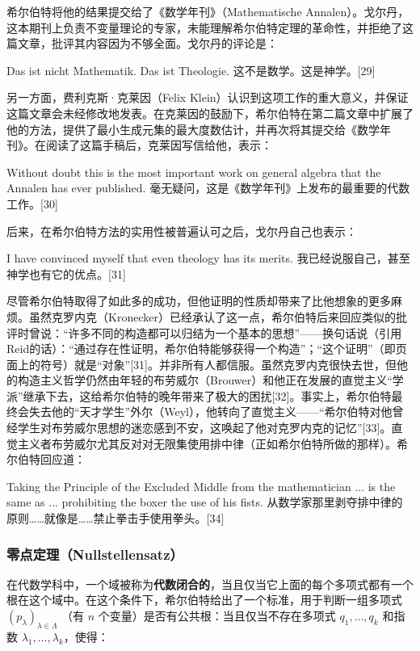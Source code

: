 希尔伯特将他的结果提交给了《数学年刊》（Mathematische Annalen）。戈尔丹，这本期刊上负责不变量理论的专家，未能理解希尔伯特定理的革命性，并拒绝了这篇文章，批评其内容因为不够全面。戈尔丹的评论是：

Das ist nicht Mathematik. Das ist Theologie.  
这不是数学。这是神学。[29]

另一方面，费利克斯·克莱因（Felix Klein）认识到这项工作的重大意义，并保证这篇文章会未经修改地发表。在克莱因的鼓励下，希尔伯特在第二篇文章中扩展了他的方法，提供了最小生成元集的最大度数估计，并再次将其提交给《数学年刊》。在阅读了这篇手稿后，克莱因写信给他，表示：

Without doubt this is the most important work on general algebra that the Annalen has ever published.  
毫无疑问，这是《数学年刊》上发布的最重要的代数工作。[30]

后来，在希尔伯特方法的实用性被普遍认可之后，戈尔丹自己也表示：

I have convinced myself that even theology has its merits. 
我已经说服自己，甚至神学也有它的优点。[31]

尽管希尔伯特取得了如此多的成功，但他证明的性质却带来了比他想象的更多麻烦。虽然克罗内克（Kronecker）已经承认了这一点，希尔伯特后来回应类似的批评时曾说：“许多不同的构造都可以归结为一个基本的思想”——换句话说（引用Reid的话）：“通过存在性证明，希尔伯特能够获得一个构造”；“这个证明”（即页面上的符号）就是“对象”[31]。并非所有人都信服。虽然克罗内克很快去世，但他的构造主义哲学仍然由年轻的布劳威尔（Brouwer）和他正在发展的直觉主义“学派”继承下去，这给希尔伯特的晚年带来了极大的困扰[32]。事实上，希尔伯特最终会失去他的“天才学生”外尔（Weyl），他转向了直觉主义——“希尔伯特对他曾经学生对布劳威尔思想的迷恋感到不安，这唤起了他对克罗内克的记忆”[33]。直觉主义者布劳威尔尤其反对对无限集使用排中律（正如希尔伯特所做的那样）。希尔伯特回应道：

Taking the Principle of the Excluded Middle from the mathematician ... is the same as ... prohibiting the boxer the use of his fists.
从数学家那里剥夺排中律的原则……就像是……禁止拳击手使用拳头。[34]
\subsubsection{零点定理（Nullstellensatz）}
在代数学科中，一个域被称为\textbf{代数闭合的}，当且仅当它上面的每个多项式都有一个根在这个域中。在这个条件下，希尔伯特给出了一个标准，用于判断一组多项式 \((p_{\lambda})_{\lambda \in \Lambda}\) （有 \(n\) 个变量）是否有公共根：当且仅当不存在多项式 \(q_1, \dots, q_k\) 和指数 \(\lambda_1, \dots, \lambda_k\)，使得：

